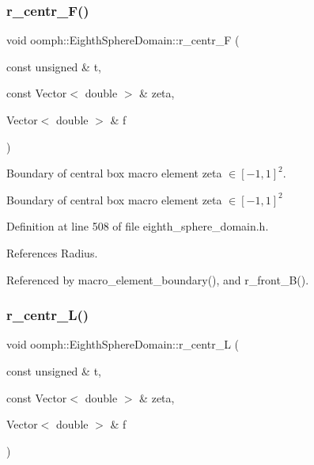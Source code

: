 \subsubsection{\texorpdfstring{r\+\_\+centr\+\_\+\+F()}{r\_centr\_F()}}
{\footnotesize\ttfamily void oomph\+::\+Eighth\+Sphere\+Domain\+::r\+\_\+centr\+\_\+F (\begin{DoxyParamCaption}\item[{const unsigned \&}]{t,  }\item[{const Vector$<$ double $>$ \&}]{zeta,  }\item[{Vector$<$ double $>$ \&}]{f }\end{DoxyParamCaption})\hspace{0.3cm}{\ttfamily [private]}}



Boundary of central box macro element zeta $ \in [-1,1]^2 $. 

Boundary of central box macro element zeta $ \in [-1,1]^2 $ 

Definition at line 508 of file eighth\+\_\+sphere\+\_\+domain.\+h.



References Radius.



Referenced by macro\+\_\+element\+\_\+boundary(), and r\+\_\+front\+\_\+\+B().

\mbox{\label{classoomph_1_1EighthSphereDomain_adc5634bf44b0689994ad68daf203e11f}} 
\subsubsection{\texorpdfstring{r\+\_\+centr\+\_\+\+L()}{r\_centr\_L()}}
{\footnotesize\ttfamily void oomph\+::\+Eighth\+Sphere\+Domain\+::r\+\_\+centr\+\_\+L (\begin{DoxyParamCaption}\item[{const unsigned \&}]{t,  }\item[{const Vector$<$ double $>$ \&}]{zeta,  }\item[{Vector$<$ double $>$ \&}]{f }\end{DoxyParamCaption})\hspace{0.3cm}{\ttfamily [private]}}



